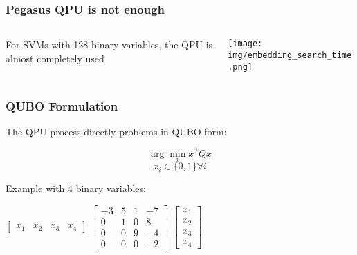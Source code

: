 \documentclass[aspectratio=169]{beamer}
\begin{document}
\begin{frame}
    \frametitle{Pegasus QPU is not enough}

    \begin{columns}
        \begin{column}{0.5\textwidth}
            For SVMs with 128 binary variables, the QPU is almost completely used
        \end{column}
        \begin{column}{0.5\textwidth}
            \centering
            \texttt{[image: img/embedding\_search\_time.png]}
        \end{column}
    \end{columns}

\end{frame}

\begin{frame}
    \frametitle{QUBO Formulation}

    The QPU process directly problems in QUBO form:

    $$\arg\min_x x^TQx$$
    $$x_i \in \{0, 1\} \forall i$$

    Example with 4 binary variables:

    \begin{center}         
        $\begin{bmatrix}
          x_1 & x_2 & x_3 & x_4
        \end{bmatrix}$
        $\begin{bmatrix}
          -3 & 5 & 1 & -7 \\
          0 & 1 & 0 & 8 \\
          0 & 0 & 9 & -4 \\
          0 & 0 & 0 & -2 
        \end{bmatrix}$
        $\begin{bmatrix}
          x_1 \\ x_2 \\ x_3 \\ x_4
        \end{bmatrix}$      
    \end{center}

\end{frame}
\end{document}
